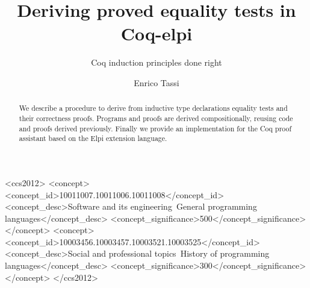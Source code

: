 \documentclass[sigplan,10pt,review]{acmart}\settopmatter{printfolios=true,printccs=false,printacmref=false}
\begin{document}
\title{Deriving proved equality tests in Coq-elpi}
\subtitle{Coq induction principles done right}

\author{Enrico Tassi}



\begin{abstract}
We describe a procedure to derive from inductive type declarations
equality tests and their correctness proofs. Programs and
proofs are derived compositionally, reusing code and proofs
derived previously.  Finally we provide an implementation for
the Coq proof assistant based on the Elpi extension language.
\end{abstract}


\begin{CCSXML}
<ccs2012>
<concept>
<concept_id>10011007.10011006.10011008</concept_id>
<concept_desc>Software and its engineering~General programming languages</concept_desc>
<concept_significance>500</concept_significance>
</concept>
<concept>
<concept_id>10003456.10003457.10003521.10003525</concept_id>
<concept_desc>Social and professional topics~History of programming languages</concept_desc>
<concept_significance>300</concept_significance>
</concept>
</ccs2012>
\end{CCSXML}





\maketitle
\end{document}

